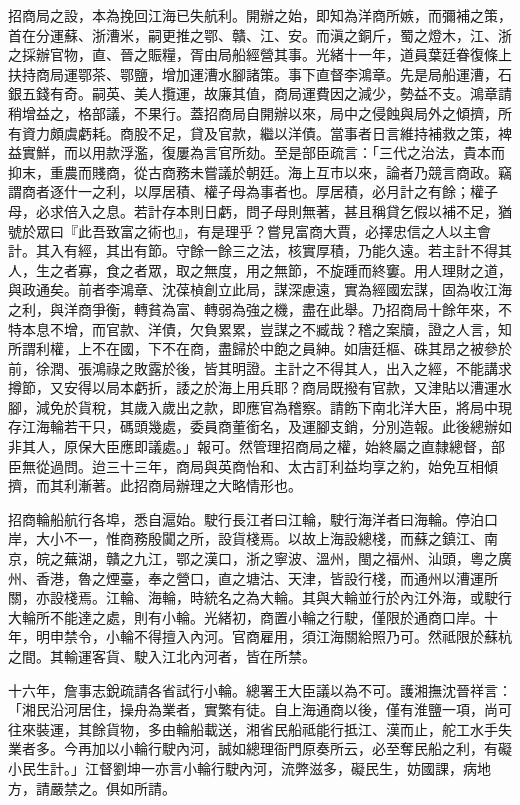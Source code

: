 \begin{pinyinscope}
招商局之設，本為挽回江海已失航利。開辦之始，即知為洋商所嫉，而彌補之策，首在分運蘇、浙漕米，嗣更推之鄂、贛、江、安。而滇之銅斤，蜀之燈木，江、浙之採辦官物，直、晉之賑糧，胥由局船經營其事。光緒十一年，道員葉廷眷復條上扶持商局運鄂茶、鄂鹽，增加運漕水腳諸策。事下直督李鴻章。先是局船運漕，石銀五錢有奇。嗣英、美人攬運，故廉其值，商局運費因之減少，勢益不支。鴻章請稍增益之，格部議，不果行。蓋招商局自開辦以來，局中之侵蝕與局外之傾擠，所有資力頗虞虧耗。商股不足，貸及官款，繼以洋債。當事者日言維持補救之策，裨益實鮮，而以用款浮濫，復屢為言官所劾。至是部臣疏言：「三代之治法，貴本而抑末，重農而賤商，從古商務未嘗議於朝廷。海上互市以來，論者乃競言商政。竊謂商者逐什一之利，以厚居積、權子母為事者也。厚居積，必月計之有餘；權子母，必求倍入之息。若計存本則日虧，問子母則無著，甚且稱貸乞假以補不足，猶號於眾曰『此吾致富之術也』，有是理乎？嘗見富商大賈，必擇忠信之人以主會計。其入有經，其出有節。守餘一餘三之法，核實厚積，乃能久遠。若主計不得其人，生之者寡，食之者眾，取之無度，用之無節，不旋踵而終窶。用人理財之道，與政通矣。前者李鴻章、沈葆楨創立此局，謀深慮遠，實為經國宏謀，固為收江海之利，與洋商爭衡，轉貧為富、轉弱為強之機，盡在此舉。乃招商局十餘年來，不特本息不增，而官款、洋債，欠負累累，豈謀之不臧哉？稽之案牘，證之人言，知所謂利權，上不在國，下不在商，盡歸於中飽之員紳。如唐廷樞、硃其昂之被參於前，徐潤、張鴻祿之敗露於後，皆其明證。主計之不得其人，出入之經，不能講求撙節，又安得以局本虧折，諉之於海上用兵耶？商局既撥有官款，又津貼以漕運水腳，減免於貨稅，其歲入歲出之款，即應官為稽察。請飭下南北洋大臣，將局中現存江海輪若干只，碼頭幾處，委員商董銜名，及運腳支銷，分別造報。此後總辦如非其人，原保大臣應即議處。」報可。然管理招商局之權，始終屬之直隸總督，部臣無從過問。迨三十三年，商局與英商怡和、太古訂利益均享之約，始免互相傾擠，而其利漸著。此招商局辦理之大略情形也。

招商輪船航行各埠，悉自滬始。駛行長江者曰江輪，駛行海洋者曰海輪。停泊口岸，大小不一，惟商務殷闐之所，設貨棧焉。以故上海設總棧，而蘇之鎮江、南京，皖之蕪湖，贛之九江，鄂之漢口，浙之寧波、溫州，閩之福州、汕頭，粵之廣州、香港，魯之煙臺，奉之營口，直之塘沽、天津，皆設行棧，而通州以漕運所關，亦設棧焉。江輪、海輪，時統名之為大輪。其與大輪並行於內江外海，或駛行大輪所不能達之處，則有小輪。光緒初，商置小輪之行駛，僅限於通商口岸。十年，明申禁令，小輪不得擅入內河。官商雇用，須江海關給照乃可。然祗限於蘇杭之間。其輸運客貨、駛入江北內河者，皆在所禁。

十六年，詹事志銳疏請各省試行小輪。總署王大臣議以為不可。護湘撫沈晉祥言：「湘民沿河居住，操舟為業者，實繁有徒。自上海通商以後，僅有淮鹽一項，尚可往來裝運，其餘貨物，多由輪船載送，湘省民船祗能行抵江、漢而止，舵工水手失業者多。今再加以小輪行駛內河，誠如總理衙門原奏所云，必至奪民船之利，有礙小民生計。」江督劉坤一亦言小輪行駛內河，流弊滋多，礙民生，妨國課，病地方，請嚴禁之。俱如所請。


\end{pinyinscope}
